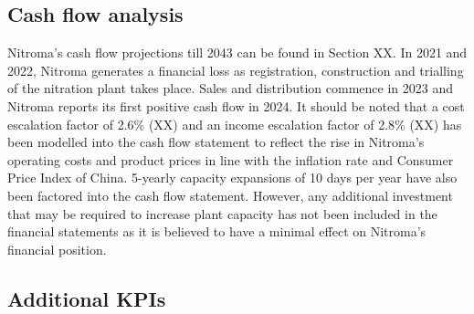 \subsection{Cash flow analysis}
\label{sec:cash-flows}
Nitroma’s cash flow projections till 2043 can be found in Section XX. In 2021 and 2022, Nitroma generates a financial loss as registration, construction and trialling of the nitration plant takes place. Sales and distribution commence in 2023 and Nitroma reports its first positive cash flow in 2024. It should be noted that a cost escalation factor of 2.6\% (XX) and an income escalation factor of 2.8\% (XX) has been modelled into the cash flow statement to reflect the rise in Nitroma’s operating costs and product prices in line with the inflation rate and Consumer Price Index of China. 5-yearly capacity expansions of 10 days per year have also been factored into the cash flow statement. However, any additional investment that may be required to increase plant capacity has not been included in the financial statements as it is believed to have a minimal effect on Nitroma’s financial position.

\subsection{Additional KPIs}
